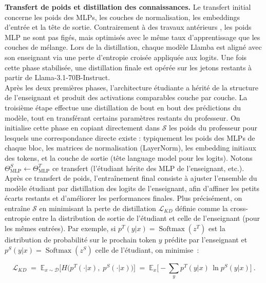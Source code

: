 \textbf{Transfert de poids et distillation des connaissances.} Le transfert initial concerne les poids des MLPs, les couches de normalisation, les embeddings d’entrée et la tête de sortie. Contrairement à des travaux antérieurs \citep{wang2025ssd, bick2024transformers}, les poids MLP ne sont pas figés, mais optimisés avec le même taux d’apprentissage que les couches de mélange. Lors de la distillation, chaque modèle Llamba est aligné avec son enseignant via une perte d'entropie croisée appliquée aux logits. Une fois cette phase stabilisée, une distillation finale est opérée sur les jetons restants à partir de Llama-3.1-70B-Instruct.\\

Après les deux premières phases, l’architecture étudiante a hérité de la structure de l'enseignant et produit des activations comparables couche par couche. La troisième étape effectue une distillation de bout en bout des prédictions du modèle, tout en transférant certains paramètres restants du professeur. On initialise cette phase en copiant directement dans $\mathcal{S}$ les poids du professeur pour lesquels une correspondance directe existe : typiquement les poids des MLPs de chaque bloc, les matrices de normalisation (LayerNorm), les embedding initiaux des tokens, et la couche de sortie (tête language model pour les logits). Notons $\Theta^S_{\text{MLP}} \leftarrow \Theta^T_{\text{MLP}}$ ce transfert (l’étudiant hérite des MLP de l'enseignant, etc.). Après ce transfert de poids, l’entraînement final consiste à ajuster l’ensemble du modèle étudiant par distillation des logits de l'enseignant, afin d’affiner les petits écarts restants et d’améliorer les performances finales. Plus précisément, on entraîne $\mathcal{S}$ en minimisant la perte de distillation $\mathcal{L}_{KD}$ définie comme la cross-entropie entre la distribution de sortie de l’étudiant et celle de l’enseignant (pour les mêmes entrées). Par exemple, si $p^T(y|x) = \operatorname{Softmax}(z^T)$ est la distribution de probabilité sur le prochain token $y$ prédite par l'enseignant et $p^S(y|x) = \operatorname{Softmax}(z^S)$ celle de l’étudiant, on minimise :

\begin{equation}
\mathcal{L}_{KD} \;=\; \mathbb{E}_{x \sim \mathcal{D}} \Big[ H\big(p^T(\cdot|x),\; p^S(\cdot|x)\big) \Big] \;=\; \mathbb{E}_{x}\Big[-\sum_{y} p^T(y|x)\, \ln p^S(y|x)\Big]~.
\end{equation}

